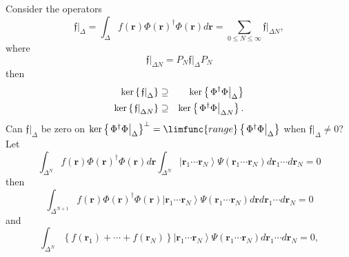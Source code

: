 \documentclass[12pt]{article}
\begin{document}
Consider the operators 
\begin{equation}
\left. \mathfrak{f}\right\vert _{\Delta }=\int_{\Delta }f\left( \boldsymbol{r%
}\right) \Phi \left( \boldsymbol{r}\right) ^{\dagger }\Phi \left( 
\boldsymbol{r}\right) d\boldsymbol{r=}\sum_{0\leq N\leq \infty }\left. 
\mathfrak{f}\right\vert _{\Delta N},
\end{equation}%
where 
\begin{equation}
\left. \mathfrak{f}\right\vert _{\Delta N}=P_{N}\left. \mathfrak{f}%
\right\vert _{\Delta }P_{N}
\end{equation}%
then  
\begin{eqnarray}
\ker \left\{ \left. \mathfrak{f}\right\vert _{\Delta }\right\}  &\supseteq
&\ker \left\{ \left. \Phi ^{\dagger }\Phi \right\vert _{\Delta }\right\}  
\notag \\
\ker \left\{ \left. \mathfrak{f}\right\vert _{\Delta N}\right\}  &\supseteq
&\ker \left\{ \left. \Phi ^{\dagger }\Phi \right\vert _{\Delta N}\right\} .
\end{eqnarray}%
Can $\left. \mathfrak{f}\right\vert _{\Delta }$ be zero on $\ker \left\{
\left. \Phi ^{\dagger }\Phi \right\vert _{\Delta }\right\} ^{\bot }=\limfunc{%
range}\left\{ \left. \Phi ^{\dagger }\Phi \right\vert _{\Delta }\right\} $
when $\left. \mathfrak{f}\right\vert _{\Delta }\neq 0?$ Let 
\begin{equation}
\int_{\Delta ^{N}}f\left( \boldsymbol{r}\right) \Phi \left( \boldsymbol{r}%
\right) ^{\dagger }\Phi \left( \boldsymbol{r}\right) d\boldsymbol{r}%
\int_{\Delta ^{N}}\left\vert \boldsymbol{r}_{1}\cdots \boldsymbol{r}%
_{N}\right\rangle \Psi \left( \boldsymbol{r}_{1}\cdots \boldsymbol{r}%
_{N}\right) d\boldsymbol{r}_{1}\cdots d\boldsymbol{r}_{N}=0
\end{equation}%
then 
\begin{equation}
\int_{\Delta ^{N+1}}f\left( \boldsymbol{r}\right) \Phi \left( \boldsymbol{r}%
\right) ^{\dagger }\Phi \left( \boldsymbol{r}\right) \left\vert \boldsymbol{r%
}_{1}\cdots \boldsymbol{r}_{N}\right\rangle \Psi \left( \boldsymbol{r}%
_{1}\cdots \boldsymbol{r}_{N}\right) d\boldsymbol{r}d\boldsymbol{r}%
_{1}\cdots d\boldsymbol{r}_{N}=0
\end{equation}%
and%
\begin{equation}
\int_{\Delta ^{N}}\left\{ f\left( \boldsymbol{r}_{1}\right) +\cdots +f\left( 
\boldsymbol{r}_{N}\right) \right\} \left\vert \boldsymbol{r}_{1}\cdots 
\boldsymbol{r}_{N}\right\rangle \Psi \left( \boldsymbol{r}_{1}\cdots 
\boldsymbol{r}_{N}\right) d\boldsymbol{r}_{1}\cdots d\boldsymbol{r}_{N}=0,
\end{equation}%
\end{document}

